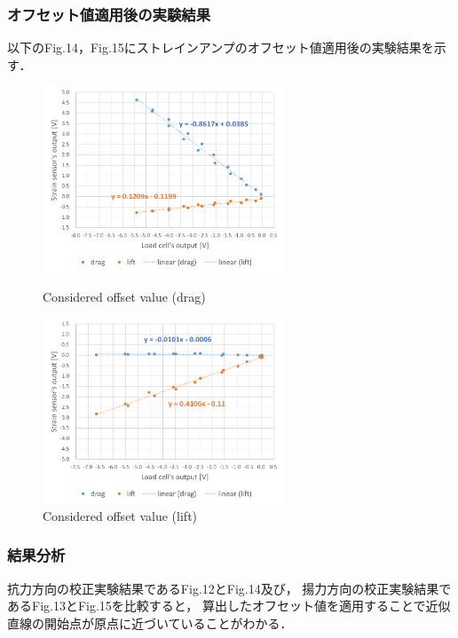 \documentclass[twocolumn,a4j]{jsarticle}
\begin{document}
\subsubsection*{オフセット値適用後の実験結果}
以下のFig.14，Fig.15にストレインアンプのオフセット値適用後の実験結果を示す．\par
\begin{figure}[htbp]
    \footnotesize
    \begin{center}
        \includegraphics[width=72mm]{../images/calibration_2_drag_offset.png}
        \caption{Considered offset value (drag)}
        \includegraphics[width=72mm]{../images/calibration_2_lift_offset.png}
        \caption{Considered offset value (lift)}
    \end{center}
\end{figure}

\subsubsection*{結果分析}

抗力方向の校正実験結果であるFig.12とFig.14及び，
揚力方向の校正実験結果であるFig.13とFig.15を比較すると，
算出したオフセット値を適用することで近似直線の開始点が原点に近づいていることがわかる．

\newpage
\end{document}
